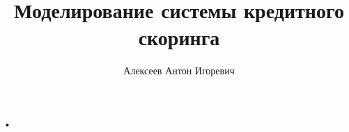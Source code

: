 \documentclass[12pt,a4paper]{book}
\author{Алексеев Антон Игоревич}
\title{Моделирование системы кредитного скоринга}
\begin{document}
•
\end{document}
